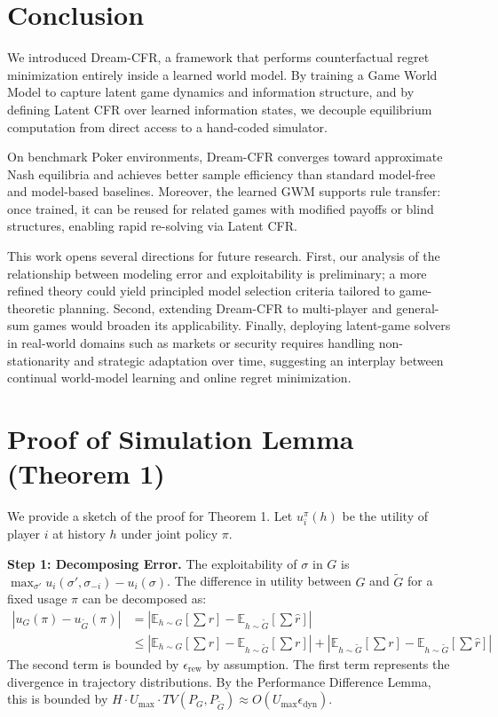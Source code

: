 \documentclass{article}
\begin{document}
\section{Conclusion}
\label{sec:conclusion}

We introduced Dream-CFR, a framework that performs counterfactual regret minimization entirely inside a learned world model. By training a Game World Model to capture latent game dynamics and information structure, and by defining Latent CFR over learned information states, we decouple equilibrium computation from direct access to a hand-coded simulator.

On benchmark Poker environments, Dream-CFR converges toward approximate Nash equilibria and achieves better sample efficiency than standard model-free and model-based baselines. Moreover, the learned GWM supports rule transfer: once trained, it can be reused for related games with modified payoffs or blind structures, enabling rapid re-solving via Latent CFR.

This work opens several directions for future research. First, our analysis of the relationship between modeling error and exploitability is preliminary; a more refined theory could yield principled model selection criteria tailored to game-theoretic planning. Second, extending Dream-CFR to multi-player and general-sum games would broaden its applicability. Finally, deploying latent-game solvers in real-world domains such as markets or security requires handling non-stationarity and strategic adaptation over time, suggesting an interplay between continual world-model learning and online regret minimization.




\appendix

\section{Proof of Simulation Lemma (Theorem 1)}
We provide a sketch of the proof for Theorem 1. Let $u_i^\pi(h)$ be the utility of player $i$ at history $h$ under joint policy $\pi$.

\textbf{Step 1: Decomposing Error.}
The exploitability of $\sigma$ in $G$ is $\max_{\sigma'} u_i(\sigma', \sigma_{-i}) - u_i(\sigma)$. The difference in utility between $G$ and $\tilde{G}$ for a fixed usage $\pi$ can be decomposed as:
\begin{align}
    |u_G(\pi) - u_{\tilde{G}}(\pi)| &= \left| \mathbb{E}_{h \sim G}[\sum r] - \mathbb{E}_{h \sim \tilde{G}}[\sum \hat{r}] \right| \\
    &\le \left| \mathbb{E}_{h \sim G}[\sum r] - \mathbb{E}_{h \sim \tilde{G}}[\sum r] \right| + \left| \mathbb{E}_{h \sim \tilde{G}}[\sum r] - \mathbb{E}_{h \sim \tilde{G}}[\sum \hat{r}] \right|
\end{align}
The second term is bounded by $\epsilon_\text{rew}$ by assumption. The first term represents the divergence in trajectory distributions. By the Performance Difference Lemma, this is bounded by $H \cdot U_{\max} \cdot TV(P_G, P_{\tilde{G}}) \approx O(U_{\max} \epsilon_\text{dyn})$.
\end{document}
